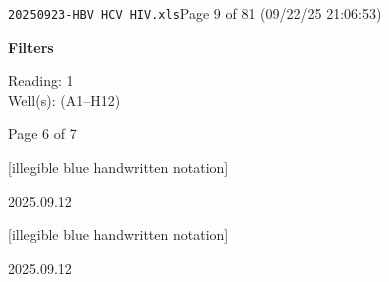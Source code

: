 \documentclass[UTF8,10pt,a4paper,fontset=fandol]{ctexart}
\newcommand{\handwritten}[1]{#1}
\begin{document}
\vfill
\noindent\texttt{20250923-HBV HCV HIV.xls}\hfill Page 9 of 81 (09/22/25 21:06:53)

\newpage

\begin{center}
\textbf{Filters}

\vspace{0.5em}
Reading: 1\\
Well(s): (A1--H12)

\vspace{1em}
\begin{figure}[h]
\centering
{}
\end{figure}

\vfill

\noindent
Page 6 of 7
\end{center}

\newpage

\handwritten{[illegible blue handwritten notation]}

\handwritten{2025.09.12}

\handwritten{[illegible blue handwritten notation]}

\handwritten{2025.09.12}
\end{document}
